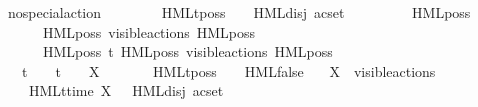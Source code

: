 \begin{isabellebody}
\ \ {\isacharbar}{\kern0pt}\ {\isacartoucheopen}no{\isacharunderscore}{\kern0pt}special{\isacharunderscore}{\kern0pt}action\ {\isasymalpha}\ {\isasymLongrightarrow}\isanewline
\ \ \ \ \ \ {\isasymsigma}{\isacharparenleft}{\kern0pt}HMLt{\isacharunderscore}{\kern0pt}poss\ {\isasymalpha}\ {\isasymphi}{\isacharparenright}{\kern0pt}\ {\isacharequal}{\kern0pt}\ HML{\isacharunderscore}{\kern0pt}disj\ {\isacharparenleft}{\kern0pt}acset\ {\isacharbraceleft}{\kern0pt}\isanewline
\ \ \ \ \ \ \ \ HML{\isacharunderscore}{\kern0pt}poss\ {\isasymalpha}\ {\isasymsigma}{\isacharparenleft}{\kern0pt}{\isasymphi}{\isacharparenright}{\kern0pt}{\isacharcomma}{\kern0pt}\isanewline
\ \ \ \ \ \ \ \ HML{\isacharunderscore}{\kern0pt}poss\ {\isasymepsilon}{\isacharbrackleft}{\kern0pt}visible{\isacharunderscore}{\kern0pt}actions{\isacharbrackright}{\kern0pt}\ {\isacharparenleft}{\kern0pt}HML{\isacharunderscore}{\kern0pt}poss\ {\isasymalpha}\ {\isasymsigma}{\isacharparenleft}{\kern0pt}{\isasymphi}{\isacharparenright}{\kern0pt}{\isacharparenright}{\kern0pt}{\isacharcomma}{\kern0pt}\isanewline
\ \ \ \ \ \ \ \ HML{\isacharunderscore}{\kern0pt}poss\ t{\isacharunderscore}{\kern0pt}{\isasymepsilon}\ {\isacharparenleft}{\kern0pt}HML{\isacharunderscore}{\kern0pt}poss\ {\isasymepsilon}{\isacharbrackleft}{\kern0pt}visible{\isacharunderscore}{\kern0pt}actions{\isacharbrackright}{\kern0pt}\ {\isacharparenleft}{\kern0pt}HML{\isacharunderscore}{\kern0pt}poss\ {\isasymalpha}\ {\isasymsigma}{\isacharparenleft}{\kern0pt}{\isasymphi}{\isacharparenright}{\kern0pt}{\isacharparenright}{\kern0pt}{\isacharparenright}{\kern0pt}\isanewline
\ \ \ \ \ \ {\isacharbraceright}{\kern0pt}{\isacharparenright}{\kern0pt}{\isacartoucheclose}\isanewline
\ \ {\isacharbar}{\kern0pt}\ {\isacartoucheopen}{\isasymalpha}\ {\isacharequal}{\kern0pt}\ t\ {\isasymor}\ {\isasymalpha}\ {\isacharequal}{\kern0pt}\ t{\isacharunderscore}{\kern0pt}{\isasymepsilon}\ {\isasymor}\ {\isasymalpha}\ {\isacharequal}{\kern0pt}\ {\isasymepsilon}{\isacharbrackleft}{\kern0pt}X{\isacharbrackright}{\kern0pt}\ {\isasymLongrightarrow}\isanewline
\ \ \ \ \ \ {\isasymsigma}{\isacharparenleft}{\kern0pt}HMLt{\isacharunderscore}{\kern0pt}poss\ {\isasymalpha}\ {\isasymphi}{\isacharparenright}{\kern0pt}\ {\isacharequal}{\kern0pt}\ HML{\isacharunderscore}{\kern0pt}false{\isacartoucheclose}\isanewline
\ \ {\isacharbar}{\kern0pt}\ {\isacartoucheopen}X\ {\isasymsubseteq}\ visible{\isacharunderscore}{\kern0pt}actions\ {\isasymLongrightarrow}\isanewline
\ \ \ \ \ \ {\isasymsigma}{\isacharparenleft}{\kern0pt}HMLt{\isacharunderscore}{\kern0pt}time\ X\ {\isasymphi}{\isacharparenright}{\kern0pt}\ {\isacharequal}{\kern0pt}\ HML{\isacharunderscore}{\kern0pt}disj\ {\isacharparenleft}{\kern0pt}acset\ {\isacharbraceleft}{\kern0pt}\isanewline

\end{isabellebody}
